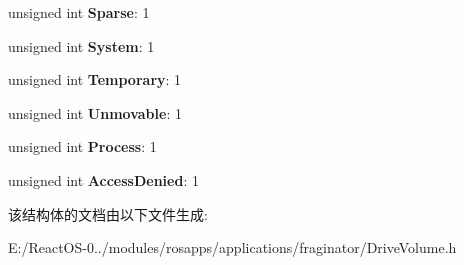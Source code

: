 \begin{DoxyCompactItemize}
unsigned int {\bfseries Sparse}\+: 1
\item 
\mbox{\label{struct_file_attr_a67ce783620461186217afe9795c1c48e}} 
unsigned int {\bfseries System}\+: 1
\item 
\mbox{\label{struct_file_attr_abb0e55f3c1ff6eb78339dc199c911d0e}} 
unsigned int {\bfseries Temporary}\+: 1
\item 
\mbox{\label{struct_file_attr_af8b5b39f50ebcc3c6dcb75f6e9d0f32c}} 
unsigned int {\bfseries Unmovable}\+: 1
\item 
\mbox{\label{struct_file_attr_a8b75b6489284dca30e082f1123b15923}} 
unsigned int {\bfseries Process}\+: 1
\item 
\mbox{\label{struct_file_attr_a189a3d25cc7c29ca6b3f68c3e415254b}} 
unsigned int {\bfseries Access\+Denied}\+: 1
\end{DoxyCompactItemize}


该结构体的文档由以下文件生成\+:\begin{DoxyCompactItemize}
\item 
E\+:/\+React\+O\+S-\/0../modules/rosapps/applications/fraginator/Drive\+Volume.\+h\end{DoxyCompactItemize}
